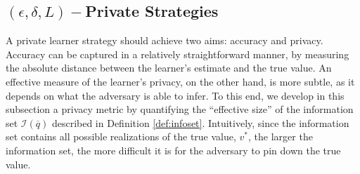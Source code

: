 \documentclass[final,12pt]{colt2018}
\def\calI{\mathcal{I}}
\def\red#1{{\color{red} #1}}
\begin{document}
\subsection{$(\epsilon,\delta,L)-$Private Strategies}\label{sec:stronger_privacy}
 
A private {learner} strategy should achieve two aims: accuracy and privacy. Accuracy can be captured in a relatively straightforward manner, by measuring the absolute distance between the {learner}'s estimate and the true value. An effective measure of the {learner}'s privacy, on the other hand, is more subtle, as it depends on what the adversary is able to infer. To this end, we develop in this subsection a privacy metric by quantifying the ``effective size'' of the information set $\calI({\overline{q}}) $ described in Definition \ref{def:infoset}. Intuitively, since the information set contains all possible realizations of the true value, $v^*$, the larger the information set, the more difficult it is for the adversary to pin down the true value. 


\end{document}
